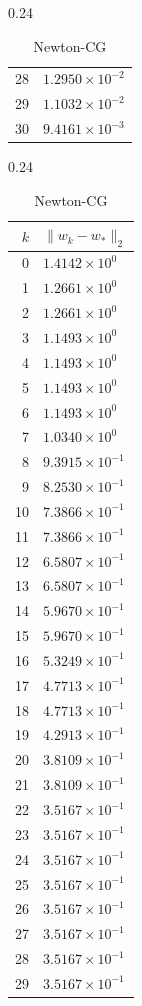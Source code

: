 \documentclass[italian, a4paper, twoside, binding=6mm]{sapthesis}
\begin{document}
\begin{table}[H]
\begin{subtable}{0.24\textwidth}
\begin{tabular}{@{}rl@{}}
28 & $1.2950\times10^{-2}$\\
29 & $1.1032\times10^{-2}$\\
30 & $9.4161\times10^{-3}$\\
\bottomrule
\end{tabular}
\end{subtable}\hfill
\begin{subtable}{0.24\textwidth}
\centering
\caption{Newton-CG}
\begin{tabular}{@{}rl@{}}
\toprule
$k$ & $\|w_k-w_*\|_2$\\
\midrule
0 & $1.4142\times10^{0}$\\
1 & $1.2661\times10^{0}$\\
2 & $1.2661\times10^{0}$\\
3 & $1.1493\times10^{0}$\\
4 & $1.1493\times10^{0}$\\
5 & $1.1493\times10^{0}$\\
6 & $1.1493\times10^{0}$\\
7 & $1.0340\times10^{0}$\\
8 & $9.3915\times10^{-1}$\\
9 & $8.2530\times10^{-1}$\\
10 & $7.3866\times10^{-1}$\\
11 & $7.3866\times10^{-1}$\\
12 & $6.5807\times10^{-1}$\\
13 & $6.5807\times10^{-1}$\\
14 & $5.9670\times10^{-1}$\\
15 & $5.9670\times10^{-1}$\\
16 & $5.3249\times10^{-1}$\\
17 & $4.7713\times10^{-1}$\\
18 & $4.7713\times10^{-1}$\\
19 & $4.2913\times10^{-1}$\\
20 & $3.8109\times10^{-1}$\\
21 & $3.8109\times10^{-1}$\\
22 & $3.5167\times10^{-1}$\\
23 & $3.5167\times10^{-1}$\\
24 & $3.5167\times10^{-1}$\\
25 & $3.5167\times10^{-1}$\\
26 & $3.5167\times10^{-1}$\\
27 & $3.5167\times10^{-1}$\\
28 & $3.5167\times10^{-1}$\\
29 & $3.5167\times10^{-1}$\\

\end{tabular}
\end{subtable}
\end{table}
\end{document}

